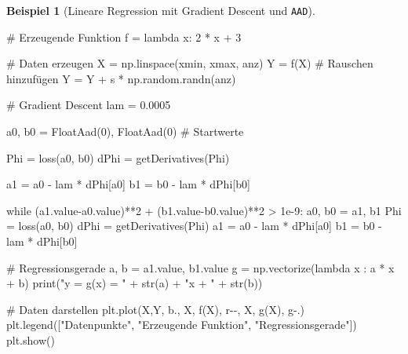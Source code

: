 \documentclass[
  a4paper,
  DIV=11]{scrreprt}
\newenvironment{Shaded}{\begin{snugshade}}{\end{snugshade}}
\newcommand{\BuiltInTok}[1]{\textcolor[rgb]{0.00,0.23,0.31}{#1}}
\newcommand{\CommentTok}[1]{\textcolor[rgb]{0.37,0.37,0.37}{#1}}
\newcommand{\ControlFlowTok}[1]{\textcolor[rgb]{0.00,0.23,0.31}{#1}}
\newcommand{\DecValTok}[1]{\textcolor[rgb]{0.68,0.00,0.00}{#1}}
\newcommand{\FloatTok}[1]{\textcolor[rgb]{0.68,0.00,0.00}{#1}}
\newcommand{\KeywordTok}[1]{\textcolor[rgb]{0.00,0.23,0.31}{#1}}
\newcommand{\NormalTok}[1]{\textcolor[rgb]{0.00,0.23,0.31}{#1}}
\newcommand{\OperatorTok}[1]{\textcolor[rgb]{0.37,0.37,0.37}{#1}}
\newcommand{\StringTok}[1]{\textcolor[rgb]{0.13,0.47,0.30}{#1}}
\theoremstyle{definition}
\theoremstyle{definition}
\newtheorem{example}{Beispiel}[chapter]
\theoremstyle{remark}
\begin{document}
\begin{example}[Lineare Regression mit Gradient Descent und
\texttt{AAD}]
\begin{Shaded}
\begin{Highlighting}[]
\CommentTok{\# Erzeugende Funktion}
\NormalTok{f }\OperatorTok{=} \KeywordTok{lambda}\NormalTok{ x: }\DecValTok{2} \OperatorTok{*}\NormalTok{ x }\OperatorTok{+} \DecValTok{3}

\CommentTok{\# Daten erzeugen}
\NormalTok{X }\OperatorTok{=}\NormalTok{ np.linspace(xmin, xmax, anz)}
\NormalTok{Y }\OperatorTok{=}\NormalTok{ f(X)}
\CommentTok{\# Rauschen hinzufügen}
\NormalTok{Y }\OperatorTok{=}\NormalTok{ Y }\OperatorTok{+}\NormalTok{ s }\OperatorTok{*}\NormalTok{ np.random.randn(anz)}


\CommentTok{\# Gradient Descent}
\NormalTok{lam }\OperatorTok{=} \FloatTok{0.0005}

\NormalTok{a0, b0 }\OperatorTok{=}\NormalTok{ FloatAad(}\DecValTok{0}\NormalTok{), FloatAad(}\DecValTok{0}\NormalTok{) }\CommentTok{\# Startwerte}

\NormalTok{Phi }\OperatorTok{=}\NormalTok{ loss(a0, b0)}
\NormalTok{dPhi }\OperatorTok{=}\NormalTok{ getDerivatives(Phi)}

\NormalTok{a1 }\OperatorTok{=}\NormalTok{ a0 }\OperatorTok{{-}}\NormalTok{ lam }\OperatorTok{*}\NormalTok{ dPhi[a0]}
\NormalTok{b1 }\OperatorTok{=}\NormalTok{ b0 }\OperatorTok{{-}}\NormalTok{ lam }\OperatorTok{*}\NormalTok{ dPhi[b0]}

\ControlFlowTok{while}\NormalTok{ (a1.value}\OperatorTok{{-}}\NormalTok{a0.value)}\OperatorTok{**}\DecValTok{2} \OperatorTok{+}\NormalTok{ (b1.value}\OperatorTok{{-}}\NormalTok{b0.value)}\OperatorTok{**}\DecValTok{2} \OperatorTok{\textgreater{}} \FloatTok{1e{-}9}\NormalTok{:}
\NormalTok{    a0, b0 }\OperatorTok{=}\NormalTok{ a1, b1}
\NormalTok{    Phi }\OperatorTok{=}\NormalTok{ loss(a0, b0)}
\NormalTok{    dPhi }\OperatorTok{=}\NormalTok{ getDerivatives(Phi)}
\NormalTok{    a1 }\OperatorTok{=}\NormalTok{ a0 }\OperatorTok{{-}}\NormalTok{ lam }\OperatorTok{*}\NormalTok{ dPhi[a0]}
\NormalTok{    b1 }\OperatorTok{=}\NormalTok{ b0 }\OperatorTok{{-}}\NormalTok{ lam }\OperatorTok{*}\NormalTok{ dPhi[b0]}

\CommentTok{\# Regressionsgerade}
\NormalTok{a, b }\OperatorTok{=}\NormalTok{ a1.value, b1.value}
\NormalTok{g }\OperatorTok{=}\NormalTok{ np.vectorize(}\KeywordTok{lambda}\NormalTok{ x : a }\OperatorTok{*}\NormalTok{ x }\OperatorTok{+}\NormalTok{ b)}
\BuiltInTok{print}\NormalTok{(}\StringTok{"y = g(x) = "} \OperatorTok{+} \BuiltInTok{str}\NormalTok{(a) }\OperatorTok{+} \StringTok{"x + "} \OperatorTok{+} \BuiltInTok{str}\NormalTok{(b))}

\CommentTok{\# Daten darstellen}
\NormalTok{plt.plot(X,Y, }\StringTok{\textquotesingle{}b.\textquotesingle{}}\NormalTok{, X, f(X), }\StringTok{\textquotesingle{}r{-}{-}\textquotesingle{}}\NormalTok{, X, g(X), }\StringTok{\textquotesingle{}g{-}.\textquotesingle{}}\NormalTok{)}
\NormalTok{plt.legend([}\StringTok{"Datenpunkte"}\NormalTok{, }\StringTok{"Erzeugende Funktion"}\NormalTok{, }\StringTok{"Regressionsgerade"}\NormalTok{])}
\NormalTok{plt.show()}
\end{Highlighting}
\end{Shaded}


\end{example}
\end{document}
